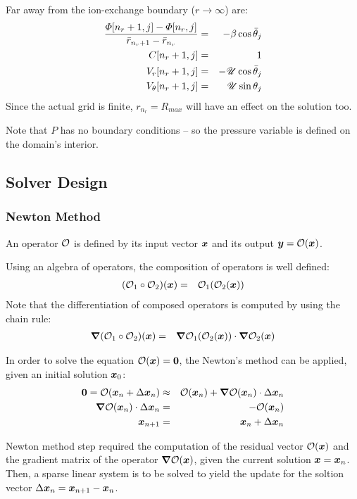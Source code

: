 Far away from the ion-exchange boundary ($r\rightarrow\infty$) are:
\begin{eqnarray}
\frac{\varPhi[n_r + 1, j] - \varPhi[n_r, j]}{\bar{r}_{n_r + 1} - \bar{r}_{n_r}} 
 & = & -\beta \cos\bar{\theta}_j \\
C[n_r + 1, j] & = & 1 \\
V_r[n_r + 1, j] & = & -\mathscr{U} \cos\bar{\theta}_j \\
V_\theta[n_r + 1, j] & = & \mathscr{U} \sin\theta_j
\end{eqnarray}
Since the actual grid is finite, $r_{n_r} = R_{max}$ will have an effect on the solution too.

Note that $P$ has no boundary conditions -- so the pressure variable is defined 
on the domain's interior.

\subsection{Solver Design}
\subsubsection{Newton Method}
An operator $\mathcal{O}$ is defined by its input vector $\boldsymbol{x}$ and its output 
$\boldsymbol{y} = \mathcal{O}(\boldsymbol{x})$.

Using an algebra of operators, the composition of operators is well defined:
\begin{eqnarray}
(\mathcal{O}_1 \circ \mathcal{O}_2)(\boldsymbol{x}) &=& \mathcal{O}_1(\mathcal{O}_2(\boldsymbol{x}))
\end{eqnarray}
Note that the differentiation of composed operators is computed by using the chain rule:
\begin{eqnarray}
\boldsymbol{\nabla}(\mathcal{O}_1 \circ \mathcal{O}_2)(\boldsymbol{x}) &=& \boldsymbol{\nabla} \mathcal{O}_1(\mathcal{O}_2(\boldsymbol{x})) \cdot \boldsymbol{\nabla} \mathcal{O}_2(\boldsymbol{x})
\end{eqnarray}

In order to solve the equation $\mathcal{O}(\boldsymbol{x}) = \boldsymbol{0}$, the Newton's method can 
be applied, given an initial solution $\boldsymbol{x}_0$:
\begin{eqnarray}
\boldsymbol{0} = \mathcal{O}(\boldsymbol{x}_n + \Delta \boldsymbol{x}_n) &\approx& \mathcal{O}(\boldsymbol{x}_n) + \boldsymbol{\nabla} \mathcal{O}(\boldsymbol{x}_n)\cdot\Delta\boldsymbol{x}_n \\
\boldsymbol{\nabla} \mathcal{O}(\boldsymbol{x}_n) \cdot \Delta \boldsymbol{x}_n &=& -\mathcal{O}(\boldsymbol{x}_n) \\
\boldsymbol{x}_{n+1} &=& \boldsymbol{x}_{n} + \Delta \boldsymbol{x}_n 
\end{eqnarray}

Newton method step required the computation of the residual vector $\mathcal{O}(\boldsymbol{x})$ and
the gradient matrix of the operator $\boldsymbol{\nabla} \mathcal{O}(\boldsymbol{x})$, 
given the current solution $\boldsymbol{x} = \boldsymbol{x}_n$.
Then, a sparse linear system is to be solved to yield the update for the soltion vector
$\Delta \boldsymbol{x}_n = \boldsymbol{x}_{n+1} - \boldsymbol{x}_n$.

